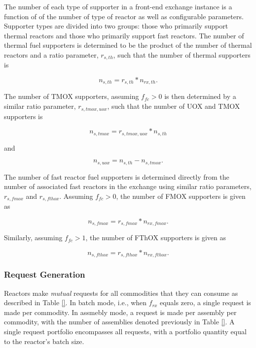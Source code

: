 The number of each type of supporter in a front-end exchange instance is a
function of of the number of type of reactor as well as configurable
parameters. Supporter types are divided into two groups: those who primarily
support thermal reactors and those who primarily support fast reactors. The
number of thermal fuel supporters is determined to be the product of the number
of thermal reactors and a ratio parameter, $r_{s, th}$, such that the number of
thermal supporters is

\begin{equation}
n_{s, th} = r_{s, th} * n_{rx, th}.
\end{equation}

The number of TMOX supporters, assuming $f_{fc} > 0$ is then determined by a
similar ratio parameter, $r_{s, tmox, uox}$, such that the number of UOX and
TMOX supporters is

\begin{equation}
n_{s, tmox} = r_{s, tmox, uox} * n_{s, th}
\end{equation}

and

\begin{equation}
n_{s, uox} = n_{s, th} - n_{s, tmox}.
\end{equation}

The number of fast reactor fuel supporters is determined directly from the number
of associated fast reactors in the exchange using similar ratio parameters,
$r_{s, fmox}$ and $r_{s, fthox}$. Assuming $f_{fc} > 0$, the number of FMOX
supporters is given as

\begin{equation}
n_{s, fmox} = r_{s, fmox} * n_{rx, fmox}.
\end{equation}

Similarly, assuming $f_{fc} > 1$, the number of FThOX supporters is given as  

\begin{equation}
n_{s, fthox} = r_{s, fthox} * n_{rx, fthox}.
\end{equation}

\subsubsection{Request Generation}\label{method:setup:front:reqgen}

Reactors make \textit{mutual} requests for all commodities that they can consume
as described in Table \ref{}. In batch mode, i.e., when $f_{rx}$ equals zero, a
single request is made per commodity. In assmebly mode, a request is made per
assembly per commodity, with the number of assemblies denoted previously in
Table \ref{}. A single request portfolio encompasses all requests, with a
portfolio quantity equal to the reactor's batch size.

